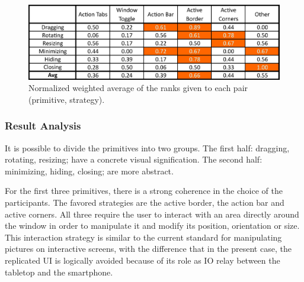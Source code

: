 \begin{figure}[htb]
  \centering
    \includegraphics[scale=1]{images/resultMatrix}
  \caption{Normalized weighted average of the ranks given to each pair (primitive, strategy).}
  \label{resultMatrix}
\end{figure}


\subsubsection{Result Analysis}

It is possible to divide the primitives into two groups.
The first half: dragging, rotating, resizing; have a concrete visual signification.
The second half: minimizing, hiding, closing; are more abstract.

For the first three primitives, there is a strong coherence in the choice of the participants.
The favored strategies are the active border, the action bar and active corners.
All three require the user to interact with an area directly around the window in order to manipulate it and modify its position, orientation or size.
This interaction strategy is similar to the current standard for manipulating pictures on interactive screens, with the difference that in the present case, the replicated UI is logically avoided because of its role as IO relay between the tabletop and the smartphone.

